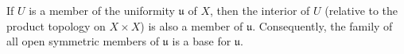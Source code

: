 If $U$ is a member of the uniformity $\mathfrak{u}$ of $X$, then the interior of $U$ (relative to the product topology on $X \times X$) is also a member of $\mathfrak{u}$. Consequently, the family of all open symmetric members of $\mathfrak{u}$ is a base for $\mathfrak{u}$.
